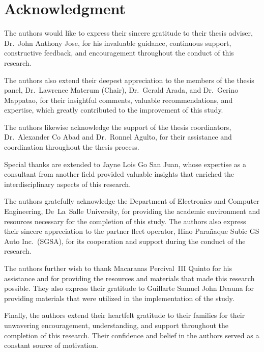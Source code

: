\chapter*{Acknowledgment}

The authors would like to express their sincere gratitude to their thesis adviser, Dr.~John Anthony Jose, for his invaluable guidance, continuous support, constructive feedback, and encouragement throughout the conduct of this research.

The authors also extend their deepest appreciation to the members of the thesis panel, Dr.~Lawrence Materum (Chair), Dr.~Gerald Arada, and Dr.~Gerino Mappatao, for their insightful comments, valuable recommendations, and expertise, which greatly contributed to the improvement of this study.

The authors likewise acknowledge the support of the thesis coordinators, Dr.~Alexander Co Abad and Dr.~Ronnel Agulto, for their assistance and coordination throughout the thesis process.

Special thanks are extended to Jayne Lois Go San Juan, whose expertise as a consultant from another field provided valuable insights that enriched the interdisciplinary aspects of this research.

The authors gratefully acknowledge the Department of Electronics and Computer Engineering, De~La~Salle University, for providing the academic environment and resources necessary for the completion of this study. The authors also express their sincere appreciation to the partner fleet operator, Hino Para\~naque Subic GS Auto Inc.~(SGSA), for its cooperation and support during the conduct of the research.

The authors further wish to thank Macaranas Percival~III Quinto for his assistance and for providing the resources and materials that made this research possible. They also express their gratitude to Guillarte Samuel John Deauna for providing materials that were utilized in the implementation of the study.

Finally, the authors extend their heartfelt gratitude to their families for their unwavering encouragement, understanding, and support throughout the completion of this research. Their confidence and belief in the authors served as a constant source of motivation.
